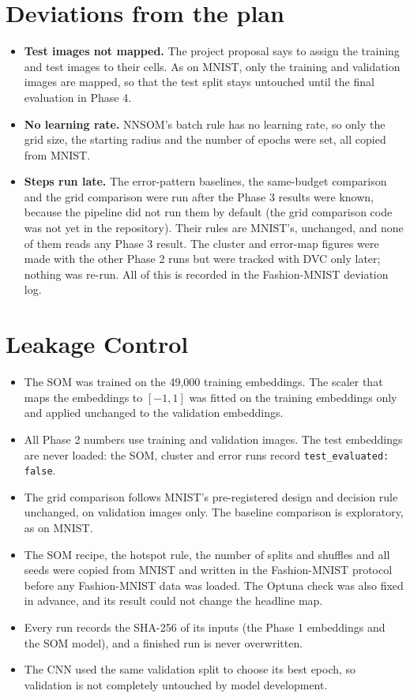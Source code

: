 \documentclass[11pt]{article}
\begin{document}
\section{Deviations from the plan}

\begin{itemize}[leftmargin=1.4em, itemsep=2pt]
\item \textbf{Test images not mapped.} The project proposal says to assign the training and test images to their cells. As on MNIST, only the training and validation images are mapped, so that the test split stays untouched until the final evaluation in Phase 4.
\item \textbf{No learning rate.} NNSOM's batch rule has no learning rate, so only the grid size, the starting radius and the number of epochs were set, all copied from MNIST.
\item \textbf{Steps run late.} The error-pattern baselines, the same-budget comparison and the grid comparison were run after the Phase 3 results were known, because the pipeline did not run them by default (the grid comparison code was not yet in the repository). Their rules are MNIST's, unchanged, and none of them reads any Phase 3 result. The cluster and error-map figures were made with the other Phase 2 runs but were tracked with DVC only later; nothing was re-run. All of this is recorded in the Fashion-MNIST deviation log.
\end{itemize}

\section{Leakage Control}

\begin{itemize}
  \item The SOM was trained on the 49,000 training embeddings. The scaler that maps the embeddings to $[-1,1]$ was fitted on the training embeddings only and applied unchanged to the validation embeddings.
  \item All Phase 2 numbers use training and validation images. The test embeddings are never loaded: the SOM, cluster and error runs record \texttt{test\_evaluated: false}.
  \item The grid comparison follows MNIST's pre-registered design and decision rule unchanged, on validation images only. The baseline comparison is exploratory, as on MNIST.
  \item The SOM recipe, the hotspot rule, the number of splits and shuffles and all seeds were copied from MNIST and written in the Fashion-MNIST protocol before any Fashion-MNIST data was loaded. The Optuna check was also fixed in advance, and its result could not change the headline map.
  \item Every run records the SHA-256 of its inputs (the Phase 1 embeddings and the SOM model), and a finished run is never overwritten.
  \item The CNN used the same validation split to choose its best epoch, so validation is not completely untouched by model development.
\end{itemize}
\end{document}
